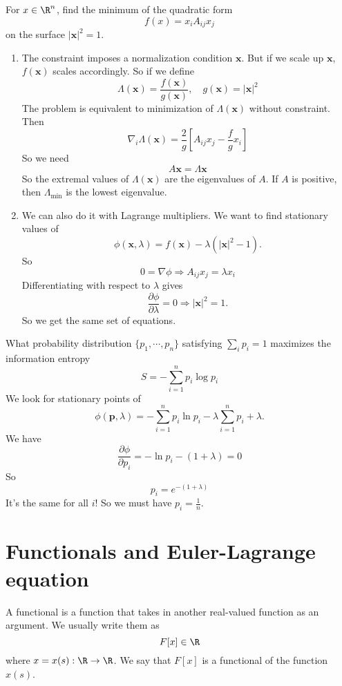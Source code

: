 \documentclass[a4paper]{article}
\begin{document}
\begin{eg}
  For $x\in \R^n$, find the minimum of the quadratic form
  \[
    f(x) = x_i A_{ij}x_j
  \]
  on the surface $|\mathbf{x}|^2 = 1$.

  \begin{enumerate}
  \item The constraint imposes a normalization condition $\mathbf{x}$. But if we scale up $\mathbf{x}$, $f(\mathbf{x})$ scales accordingly. So if we define
    \[
      \Lambda(\mathbf{x}) = \frac{f(\mathbf{x})}{g(\mathbf{x})},\quad g(\mathbf{x}) = |\mathbf{x}|^2
    \]
    The problem is equivalent to minimization of $\Lambda (\mathbf{x})$ without constraint. Then
    \[
      \nabla_i \Lambda(\mathbf{x}) = \frac{2}{g}\left[A_{ij} x_j - \frac{f}{g} x_i\right]
    \]
    So we need
    \[
      A\mathbf{x} = \Lambda \mathbf{x}
    \]
    So the extremal values of $\Lambda (\mathbf{x})$ are the eigenvalues of $A$. If $A$ is positive, then $\Lambda_{\min}$ is the lowest eigenvalue.

  \item We can also do it with Lagrange multipliers. We want to find stationary values of 
    \[
      \phi(\mathbf{x}, \lambda) = f(\mathbf{x}) - \lambda(|\mathbf{x}|^2 - 1).
    \]
    So
    \[
      0 = \nabla \phi \Rightarrow  A_{ij} x_j = \lambda x_i
    \]
    Differentiating with respect to $\lambda$ gives
    \[
      \frac{\partial \phi}{\partial \lambda} = 0 \Rightarrow  |\mathbf{x}|^2 = 1.
    \]
    So we get the same set of equations.
  \end{enumerate}
\end{eg}

\begin{eg}
  What probability distribution $\{p_1, \cdots, p_n\}$ satisfying $\sum_i p_i = 1$ maximizes the information entropy
  \[
    S = - \sum_{i = 1}^n p_i \log p_i
  \]
  We look for stationary points of
  \[
    \phi(\mathbf{p}, \lambda) = -\sum_{i = 1}^n p_i \ln p_i - \lambda\sum_{i = 1}^n p_i + \lambda.
  \]
  We have
  \[
    \frac{\partial \phi}{\partial p_i}= - \ln p_i - (1 + \lambda) = 0
  \]
  So
  \[
    p_i = e^{-(1 + \lambda)}
  \]
  It's the same for all $i$! So we must have $p_i = \frac{1}{n}$.
\end{eg}
\section{Functionals and Euler-Lagrange equation}
\begin{defi}[Functional]
  A functional is a function that takes in another real-valued function as an argument. We usually write them as
  \[
    F[ x] \in \R
  \]
  where $x = x(s): \R \to \R$. We say that $F[ x]$ is a functional of the function $x(s)$.
\end{defi}
\end{document}
